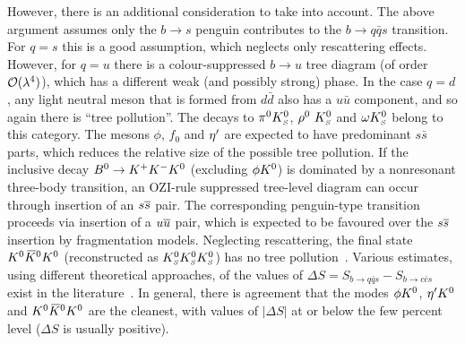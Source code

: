 However, there is an additional consideration to take into account.
The above argument assumes only the $b \to s$ penguin contributes
to the $b \to q\bar q s$ transition.
For $q = s$ this is a good assumption, which neglects only rescattering effects.
However, for $q = u$ there is a colour-suppressed $b \to u$ tree diagram
(of order ${\cal O}(\lambda^4)$), 
which has a different weak (and possibly strong) phase.
In the case $q = d$, any light neutral meson that is formed from $d \bar{d}$ 
also has a $u \bar{u}$ component, and so again there is ``tree pollution''. 
The \Bz decays to $\pi^0K^0_{\scriptscriptstyle S}$, $\rho^0\hbox{ }K^0_{\scriptscriptstyle S}$ and $\omega K^0_{\scriptscriptstyle S}$ belong to this category.
The mesons $\phi$, $f_0$ and ${\eta^{\prime}}$ are expected to have predominant
$s\bar{s}$ parts, which reduces the relative size of the possible tree
pollution. 
If the inclusive decay $B^0\to K^+K^-K^0$ (excluding $\phi K^0$) is dominated by
a nonresonant three-body transition, 
an OZI-rule suppressed tree-level diagram can occur 
through insertion of an $s\overline s$ pair. 
The corresponding penguin-type transition 
proceeds via insertion of a $u\overline u$ pair, which is expected
to be favoured over the $s\overline s$ insertion by fragmentation models.
Neglecting rescattering, the final state $K^0\kern 0.2em\overline{\kern -0.2em K}{}^0K^0$ 
(reconstructed as $K^0_{\scriptscriptstyle S}K^0_{\scriptscriptstyle S}K^0_{\scriptscriptstyle S}$) has no tree pollution~\cite{Gershon:2004tk}.
Various estimates, using different theoretical approaches,
of the values of $\Delta S = S_{b \to q\bar q s} - S_{b \to c\bar c s}$
exist in the literature~\cite{Grossman:2003qp,Gronau:2003ep,Gronau:2003kx,Gronau:2004hp,Cheng:2005bg,Gronau:2005gz,Buchalla:2005us,Beneke:2005pu,Engelhard:2005hu,Cheng:2005ug,Engelhard:2005ky,Gronau:2006qh,Silvestrini:2007yf,Dutta:2008xw}.
In general, there is agreement that the modes
$\phi K^0$, ${\eta^{\prime}}K^0$ and $K^0\kern 0.2em\overline{\kern -0.2em K}{}^0K^0$ are the cleanest,
with values of $\left| \Delta S \right|$ at or below the few percent level 
($\Delta S$ is usually positive).

\label{sec:cp_uta:qqs:cp_eigen}

